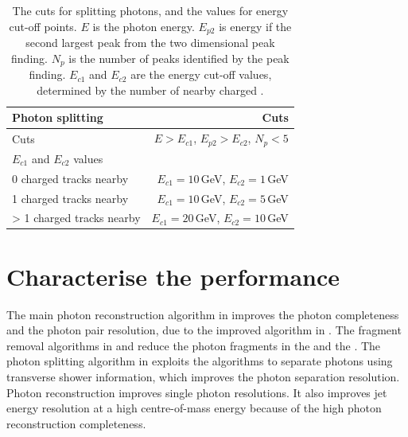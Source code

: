 \begin{table}[htbp]
\centering
\smallskip
\begin{tabular}{l r }
\hline
\hline
Photon splitting&  Cuts\\
\hline
\multicolumn{1}{L{0.3\textwidth}}{Cuts} & \multicolumn{1}{R{0.6\textwidth}}{$E > E_{c1}$, $E_{p2} > E_{c2}$, $N_{p} < 5$} \\
\hline
$E_{c1}$ and $E_{c2}$ values &  \\
\hline
\multicolumn{1}{L{0.3\textwidth}}{0 charged tracks nearby} & \multicolumn{1}{R{0.6\textwidth}}{$E_{c1} = 10$\,GeV, $E_{c2} = 1$\,GeV} \\
\multicolumn{1}{L{0.3\textwidth}}{1 charged tracks nearby} & \multicolumn{1}{R{0.6\textwidth}}{$E_{c1} = 10$\,GeV, $E_{c2} = 5$\,GeV} \\
\multicolumn{1}{L{0.3\textwidth}}{> 1 charged tracks nearby} & \multicolumn{1}{R{0.6\textwidth}}{$E_{c1} = 20$\,GeV, $E_{c2} = 10$\,GeV} \\
\hline
\hline
\end{tabular}

\caption[Cuts for splitting photons.]%
{The cuts for splitting photons, and the values for energy cut-off points. $E$ is the photon energy. $E_{p2}$ is  energy if the second largest peak from the two dimensional peak finding. $N_{p}$ is the number of peaks identified by the peak finding. $E_{c1}$ and $E_{c2}$ are the energy cut-off values, determined by the number of nearby charged .}
\label{tab:photonPhotonSplitting}
\end{table}

\section{Characterise the performance}



The main photon reconstruction algorithm in  improves the photon completeness and the photon pair resolution, due to the improved \peakFinding algorithm in . The fragment removal algorithms in  and  reduce the photon fragments in the \ECAL and the \HCAL. The photon splitting algorithm in  exploits the \peakFinding algorithms to separate photons using transverse shower information, which improves the photon separation resolution. Photon reconstruction improves single photon resolutions. It also improves jet energy resolution at a high centre-of-mass energy because of the high photon reconstruction completeness.

